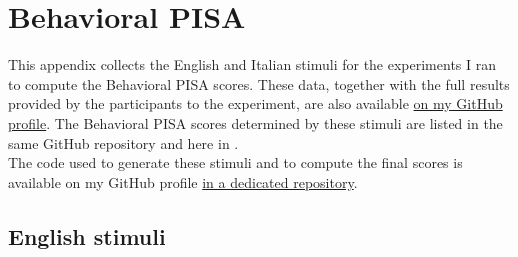 \setchapterpreamble[u]{\margintoc}
\chapter{Behavioral PISA}

This appendix collects the English and Italian stimuli for the experiments I ran to compute the Behavioral PISA scores. These data, together with the full results provided by the participants to the experiment, are also available \href{https://github.com/giuliacappelli/dissertationData}{on my GitHub profile}. The Behavioral PISA scores determined by these stimuli are listed in the same GitHub repository and here in .\\
The code used to generate these stimuli and to compute the final scores is available on my GitHub profile \href{https://github.com/giuliacappelli/behavioralPISA}{in a dedicated repository}.

\section{English stimuli}

